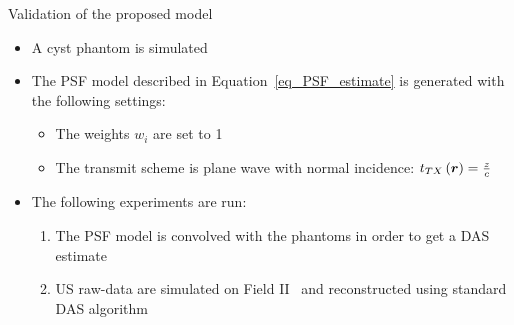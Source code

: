 {\begin{block}{Validation of the proposed model}
	\begin{itemize}
		\item A cyst phantom is simulated
		\item The PSF model described in Equation~\eqref{eq_PSF_estimate} is generated with the following settings:
		\begin{itemize}
			\item The weights $w_i$ are set to 1
			\item The transmit scheme is plane wave with normal incidence: $t_{TX} \left(\bm{r}\right) = \frac{z}{c}$
		\end{itemize}
		\item The following experiments are run:
		\begin{enumerate}
			\item The PSF model is convolved with the phantoms in order to get a DAS estimate
			\item US raw-data are simulated on Field II~\cite{jensen1992} and reconstructed using standard DAS algorithm
		\end{enumerate}
	\end{itemize}
	\newlength{\CIRSFigWidth} \setlength{\CIRSFigWidth}{0.48\textwidth}
	\newlength{\CIRSFigHeight}

\end{block}}
